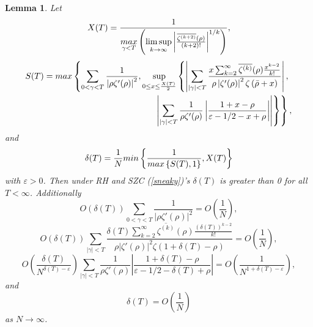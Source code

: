 \documentclass[10pt,a4paper]{amsart}
\newtheorem{lemma}{Lemma}
\begin{document}
\begin{lemma}
Let
\begin{equation}
X(T)=\frac{1}{\underset{\gamma<T}{\textnormal{max}}\left(\underset{k\rightarrow \infty}{\lim\sup}\left|\frac{\overline{\zeta^{(k+2)}}(\rho)}{(k+2)!}\right|^{1/k}\right)},  \label{x bound}
\end{equation}
\begin{align}
S(T)=\textnormal{max}\left\{\sum_{0<\gamma<T}\frac{1}{\left|\rho\zeta'(\rho)\right|^{2}},\sup_{0\leq x \leq \frac{X(T)}{2}}\left\{\left|\sum_{\left|\gamma\right|<T}\frac{x\sum_{k=2}^{\infty}\overline{\zeta^{(k)}}(\rho)\frac{x^{k-2}}{k!}}{\rho\left|\zeta'(\rho)\right|^{2}\zeta\left(\bar{\rho}+x\right)}\right|, \right. \right. \nonumber \\ \left. \left. \left|\sum_{\left|\gamma\right|<T}\frac{1}{\rho\zeta'(\rho)}\left|\frac{1+x-\rho}{\varepsilon-1/2-x+\rho}\right|\right|\right\} \right\},
\label{da sup}
\end{align}
and
\begin{equation}
\delta(T)=\frac{1}{N}\textnormal{min}\left\{\frac{1}{\textnormal{max}\left\{S(T),1\right\}},X(T)\right\} \label{sneaky}
\end{equation}
with $\varepsilon>0$. Then under RH and SZC (\ref{sneaky})'s $\delta(T)$ is greater than 0 for all $T<\infty$. Additionally 
\begin{equation}
O\left(\delta(T)\right)\sum_{0<\gamma<T}\frac{1}{\left|\rho\zeta'(\rho)\right|^{2}}=O\left(\frac{1}{N}\right), \label{probterm1}
\end{equation}
\begin{equation}
O\left(\delta(T)\right)\sum_{\left|\gamma\right|<T}\frac{\delta(T)\sum_{k=2}^{\infty}\overline{\zeta^{(k)}}(\rho)\frac{\left(\delta(T)\right)^{k-2}}{k!}}{\rho \left|\zeta'(\rho)\right|^{2}\zeta\left(1+\delta(T)-\rho\right)}=O\left(\frac{1}{N}\right), \label{probterm2}
\end{equation}
\begin{equation}
O\left(\frac{\delta(T)}{N^{\delta(T)-\varepsilon}}\right)\sum_{\left|\gamma\right|<T}\frac{1}{\rho\zeta'(\rho)}\left|\frac{1+\delta(T)-\rho}{\varepsilon-1/2-\delta(T)+\rho}\right|=O\left(\frac{1}{N^{1+\delta(T)-\varepsilon}}\right), \label{probterm3}
\end{equation}
and 
\begin{equation}
\delta(T)=O\left(\frac{1}{N}\right) \label{sneaked}
\end{equation}
as $N\rightarrow \infty$. 
\label{delta lemma}
\end{lemma}
\end{document}
